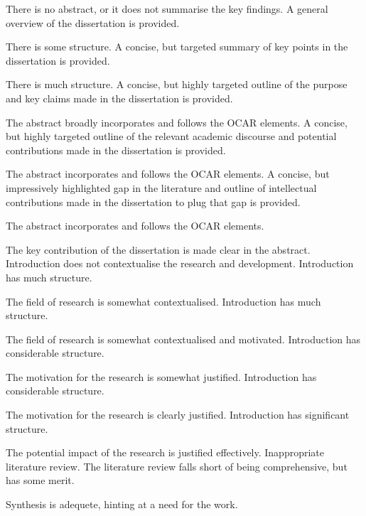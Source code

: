 \begin{markingrubric}
%
        \grade \fail There is no abstract, or it does not summarise the key findings.
      \grade A general overview of the dissertation is provided.
        	\par There is some structure.		
      \grade A concise, but targeted summary of key points in the dissertation is provided.
        	\par There is much structure.	      	
       \grade A concise, but highly targeted outline of the purpose and key claims made in the dissertation is provided.
        	\par The abstract broadly incorporates and follows the OCAR elements.	  
      \grade A concise, but highly targeted outline of the relevant academic discourse and potential contributions made in the dissertation is provided.
        	\par The abstract incorporates and follows the OCAR elements.	      	
       \grade A concise, but impressively highlighted gap in the literature and outline of intellectual contributions made in the dissertation to plug that gap is provided. 
        	\par The abstract incorporates and follows the OCAR elements.
        	\par The key contribution of the dissertation is made clear in the abstract.
%
        \grade \fail Introduction does not contextualise the research and development.
      \grade Introduction has much structure.
        	\par The field of research is somewhat contextualised.
      \grade Introduction has much structure.
        	\par The field of research is somewhat contextualised and motivated.	      	
       \grade Introduction has considerable structure.
        	\par The motivation for the research is somewhat justified.	  
      \grade Introduction has considerable structure.
        	\par The motivation for the research is clearly justified.	 	      	
       \grade Introduction has significant structure.
        	\par The potential impact of the research is justified effectively.
%  		
        \grade \fail Inappropriate literature review.
        \grade The literature review falls short of being comprehensive, but has some merit.
        	\par  Synthesis is adequete, hinting at a need for the work.

\end{markingrubric}
